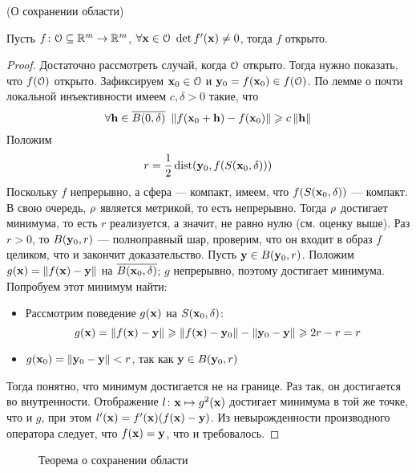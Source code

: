 \begin{theorem}(О сохранении области)

    Пусть $f \colon \mathcal{O} \subseteq \mathbb{R}^m \to \mathbb{R}^m$, $\forall \mathbf{x} \in \mathcal{O}~ \det{f'(\mathbf{x})}
    \neq 0$, тогда $f$ открыто.
\end{theorem}
\begin{proof}
    Достаточно рассмотреть случай, когда $\mathcal{O}$ открыто. Тогда нужно показать, что
    $f(\mathcal{O})$ открыто. Зафиксируем $\mathbf{x}_0 \in \mathcal{O}$ и $\mathbf{y}_0 = f(\mathbf{x}_0) \in f(\mathcal{O})$.
    По лемме о почти локальной инъективности имеем $c, \delta > 0$ такие, что
\[
    \forall \mathbf{h} \in \overline{B(0, \delta)}~ \left\lVert f(\mathbf{x}_0 + \mathbf{h}) - f(\mathbf{x}_0)\right\rVert
    \geqslant c \left\lVert\mathbf{h}\right\rVert
\]
    Положим
\[
    r = \frac{1}{2}\operatorname{dist}(\mathbf{y}_0, f(S(\mathbf{x}_0, \delta)))
\]
    Поскольку $f$ непрерывно, а сфера --- компакт, имеем, что $f(S(\mathbf{x}_0, \delta))$
    --- компакт. В свою очередь, $\rho$ является метрикой, то есть непрерывно. Тогда
    $\rho$ достигает минимума, то есть $r$ реализуется, а значит, не равно нулю
    (см. оценку выше). Раз $r > 0$, то $B(\mathbf{y}_0, r)$ --- полноправный шар,
    проверим, что он входит в образ $f$ целиком, что и закончит доказательство.
    Пусть $\mathbf{y} \in B(\mathbf{y}_0, r)$. Положим $g(\mathbf{x}) = \left\lVert f(\mathbf{x}) - \mathbf{y}\right\rVert$ на
    $\overline{B(\mathbf{x}_0, \delta)}$; $g$ непрерывно, поэтому достигает минимума.
    Попробуем этот минимум найти:
\begin{itemize}
    \item Рассмотрим поведение $g(\mathbf{x})$ на $S(\mathbf{x}_0, \delta)$:
\[
    g(\mathbf{x}) = \left\lVert f(\mathbf{x}) - \mathbf{y}\right\rVert \geqslant \left\lVert f(\mathbf{x}) - \mathbf{y}_0\right\rVert - \left\lVert\mathbf{y}_0 - \mathbf{y}\right\rVert
    \geqslant 2r - r = r
\]
    \item $g(\mathbf{x}_0) = \left\lVert\mathbf{y}_0 - \mathbf{y}\right\rVert < r$, так как $\mathbf{y} \in B(\mathbf{y}_0, r)$
\end{itemize}
    Тогда понятно, что минимум достигается не на границе. Раз так, он достигается
    во внутренности. Отображение $l\colon \mathbf{x} \mapsto g^2(\mathbf{x})$ достигает минимума в
    той же точке, что и $g$, при этом $l'(\mathbf{x}) = f'(\mathbf{x})(f(\mathbf{x}) - \mathbf{y})$. Из
    невырожденности производного оператора следует, что $f(\mathbf{x}) = \mathbf{y}$, что и
    требовалось.
\end{proof}

\begin{figure}[ht]
    \centering
    \caption{Теорема о сохранении области}
\end{figure}

